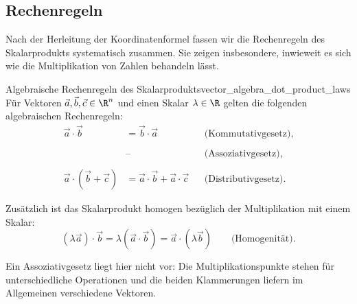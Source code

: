 \subsection{Rechenregeln}
\label{subsec:vector_algebra_scalar_product_rules}

Nach der Herleitung der Koordinatenformel fassen wir die Rechenregeln des
Skalarprodukts systematisch zusammen. Sie zeigen insbesondere, inwieweit es
sich wie die Multiplikation von Zahlen behandeln lässt.

\begin{TheoremBox}{Algebraische Rechenregeln des Skalarprodukts}{vector_algebra_dot_product_laws}
  Für Vektoren $\vec a,\vec b,\vec c\in\R^n$ und einen Skalar
  $\lambda\in\R$ gelten die folgenden algebraischen Rechenregeln:
  \[
    \begin{aligned}
      \vec a\cdot\vec b
        &=\vec b\cdot\vec a
        &&\text{(Kommutativgesetz)},\\[0.5em]
      \phantom{\vec a\cdot(\vec b+\vec c)}
        &\text{--}
        &&\text{(Assoziativgesetz)},\\[0.5em]
      \vec a\cdot(\vec b+\vec c)
        &=\vec a\cdot\vec b+\vec a\cdot\vec c
        &&\text{(Distributivgesetz)}.
    \end{aligned}
  \]

  Zusätzlich ist das Skalarprodukt homogen bezüglich der Multiplikation
  mit einem Skalar:
  \[
    (\lambda\vec a)\cdot\vec b
      =\lambda(\vec a\cdot\vec b)
      =\vec a\cdot(\lambda\vec b)
      \qquad\text{(Homogenität)}.
  \]
\end{TheoremBox}

Ein Assoziativgesetz liegt hier nicht vor: Die Multiplikationspunkte stehen
für unterschiedliche Operationen und die beiden Klammerungen liefern im
Allgemeinen verschiedene Vektoren.

\noindent
\begin{minipage}[c]{0.72\linewidth}
  \centering
\end{minipage}\hfill
\begin{minipage}[c]{0.25\linewidth}
  \centering
\end{minipage}

